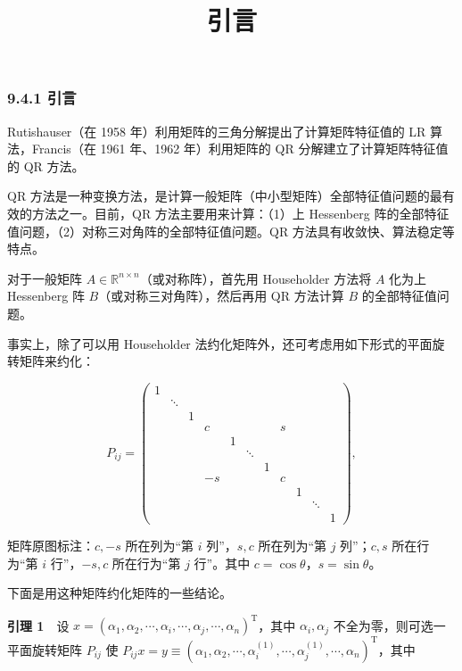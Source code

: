 \documentclass[
  10pt,
  fontset=fandol]{ctexart}
\title{引言}
\author{}
\date{}
\begin{document}
\maketitle

\subsubsection{9.4.1 引言}\label{ux5f15ux8a00}

Rutishauser（在 1958 年）利用矩阵的三角分解提出了计算矩阵特征值的 LR 算法，Francis（在 1961 年、1962 年）利用矩阵的 QR 分解建立了计算矩阵特征值的 QR 方法。

QR 方法是一种变换方法，是计算一般矩阵（中小型矩阵）全部特征值问题的最有效的方法之一。目前，QR 方法主要用来计算：（1）上 Hessenberg 阵的全部特征值问题，（2）对称三对角阵的全部特征值问题。QR 方法具有收敛快、算法稳定等特点。

对于一般矩阵 \(A\in\mathbb R^{n\times n}\)（或对称阵），首先用 Householder 方法将 \(A\) 化为上 Hessenberg 阵 \(B\)（或对称三对角阵），然后再用 QR 方法计算 \(B\) 的全部特征值问题。

事实上，除了可以用 Householder 法约化矩阵外，还可考虑用如下形式的平面旋转矩阵来约化：

\[
P_{ij}=\left(\begin{array}{*{11}{c}}
1&&&&&&&&&&\\
&\ddots&&&&&&&&&\\
&&1&&&&&&&&\\
&&&c&&&&s&&&\\
&&&&1&&&&&&\\
&&&&&\ddots&&&&&\\
&&&&&&1&&&&\\
&&&-s&&&&c&&&\\
&&&&&&&&1&&\\
&&&&&&&&&\ddots&\\
&&&&&&&&&&1
\end{array}\right),
\tag{9.4.1}
\]

矩阵原图标注：\(c,-s\) 所在列为``第 \(i\) 列''，\(s,c\) 所在列为``第 \(j\) 列''；\(c,s\) 所在行为``第 \(i\) 行''，\(-s,c\) 所在行为``第 \(j\) 行''。其中 \(c=\cos\theta\)，\(s=\sin\theta\)。

下面是用这种矩阵约化矩阵的一些结论。

\textbf{引理 1}　设 \(x=(\alpha_1,\allowbreak \alpha_2,\allowbreak \cdots,\allowbreak \alpha_i,\allowbreak \cdots,\allowbreak \alpha_j,\allowbreak \cdots,\allowbreak \alpha_n)^{\mathrm T}\)，其中 \(\alpha_i,\alpha_j\) 不全为零，则可选一平面旋转矩阵 \(P_{ij}\) 使 \(P_{ij}x=y\equiv(\alpha_1,\allowbreak \alpha_2,\allowbreak \cdots,\allowbreak \alpha_i^{(1)},\allowbreak \cdots,\allowbreak \alpha_j^{(1)},\allowbreak \cdots,\allowbreak \alpha_n)^{\mathrm T}\)，其中
\end{document}
